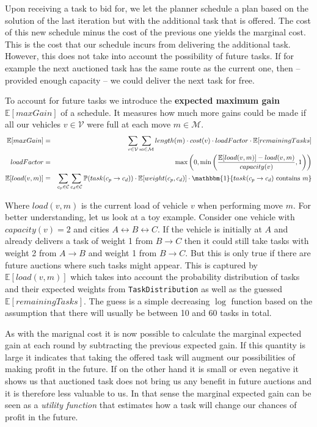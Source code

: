 \documentclass[11pt]{article}
\begin{document}
Upon receiving a task to bid for, we let the planner schedule a plan based on 
the solution of the last iteration but with the additional task that is offered. 
The cost of this new schedule minus the cost of the previous one yields the 
marginal cost. This is the cost that our schedule incurs from delivering the 
additional task. However, this does not take into account the possibility of 
future tasks. If for example the next auctioned task has the same route as 
the current one, then -- provided enough capacity -- we could deliver the next 
task for free.

To account for future tasks we introduce the \textbf{expected maximum gain}
$\mathbb{E}[maxGain]$ of a schedule. It measures how much more gains could be
made if all our vehicles $v \in \mathcal{V}$ were full at each move $m \in
\mathcal{M}$.
\begin{eqnarray*}
\mathbb{E}[maxGain] &=& 
\sum_{v \in \mathcal{V}} 
\sum_{m \in \mathcal{M}}
length(m) \cdot cost(v) \cdot 
loadFactor\cdot
\mathbb{E}[remainingTasks]
\\
loadFactor &=& \max\left(0, \min\left( 
\frac{\mathbb{E}[load(v, m)] - load(v, m)}{capacity(v)},
1 \right)\right)
\\
\mathbb{E}[load(v, m)] &=& 
\sum_{c_p \in \mathcal{C}} \sum_{c_d \in \mathcal{C}}
\mathbb{P}(task(c_p \rightarrow c_d)) 
\cdot \mathbb{E}[weight(c_p, c_d)] \cdot
\mathbbm{1}\{task(c_p \rightarrow c_d) \text{ contains } m\} 
\end{eqnarray*}

Where $load(v, m)$ is the current load of vehicle $v$ when performing move $m$.
For better understanding, let us look at a toy example. Consider one vehicle
with $capacity(v) = 2$ and cities $A \leftrightarrow B \leftrightarrow C$. If
the vehicle is initially at $A$ and already delivers a task of weight 1 from $B
\rightarrow C$ then it could still take tasks with weight 2 from $A \rightarrow
B$ and weight 1 from $B \rightarrow C$. But this is only true if there are
future auctions where such tasks might appear. This is captured by
$\mathbb{E}[load(v, m)]$ which takes into account the probability distribution
of tasks and their expected weights from \texttt{TaskDistribution} as well as
the guessed $\mathbb{E}[remainingTasks]$. The guess is a simple decreasing
$\log$ function based on the assumption that there will usually be between 10
and 60 tasks in total.

As with the marignal cost it is now possible to calculate the marginal expected
gain at each round by subtracting the previous expected gain. If this quantity
is large it indicates that taking the offered task will augment our
possibilities of making profit in the future. If on the other hand it is small
or even negative it shows us that auctioned task does not bring us any benefit
in future auctions and it is therefore less valuable to us. In that sense the
marginal expected gain can be seen as a \textit{utility function} that estimates
how a task will change our chances of profit in the future.
\end{document}
